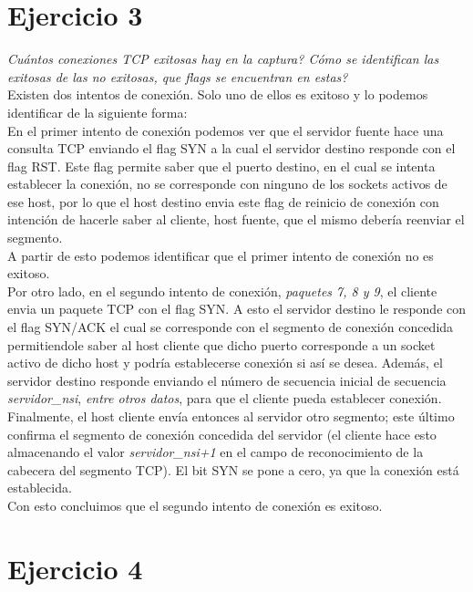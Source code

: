 \documentclass[osajnl,twocolumn,showpacs,superscriptaddress,10pt]{revtex4-1} %
\begin{document}
\section{Ejercicio 3}

\textit{Cuántos conexiones TCP exitosas hay en la captura? Cómo se identifican las exitosas de las no exitosas, que flags se encuentran en estas?} \\

Existen dos intentos de conexión. Solo uno de ellos es exitoso y lo podemos identificar de la siguiente forma: \\

En el primer intento de conexión podemos ver que el servidor fuente hace una consulta TCP enviando el flag SYN a la cual el servidor 
destino responde con el flag RST. Este flag permite saber que el puerto destino, en el cual se intenta establecer la conexión, no se
corresponde con ninguno de los sockets activos de ese host, por lo que el host destino envia este flag de reinicio de conexión 
con intención de hacerle saber al cliente, host fuente, que el mismo debería reenviar el segmento. \\

A partir de esto podemos identificar que el primer intento de conexión no es exitoso. \\

Por otro lado, en el segundo intento de conexión, \textit{paquetes 7, 8 y 9}, el cliente envia un paquete TCP con el flag SYN. 
A esto el servidor destino le responde con el flag SYN/ACK el cual se corresponde con el segmento de conexión concedida permitiendole
saber al host cliente que dicho puerto corresponde a un socket activo de dicho host y podría establecerse conexión si así se desea.
Además, el servidor destino responde enviando el número de secuencia inicial de secuencia \textit{servidor\_nsi}, \textit{entre otros datos}, para que el
cliente pueda establecer conexión. Finalmente, el  host cliente envía entonces al servidor otro segmento; este último confirma el 
segmento de conexión concedida del servidor (el cliente hace esto almacenando el valor \textit{servidor\_nsi+1} en el campo de reconocimiento 
de la cabecera del segmento TCP). El bit SYN se pone a cero, ya que la conexión está establecida. \\

Con esto concluimos que el segundo intento de conexión es exitoso. \\

\section{Ejercicio 4}
\end{document}
